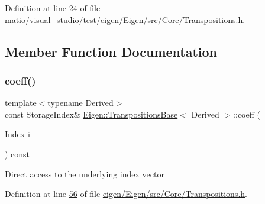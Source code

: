 Definition at line \hyperlink{matio_2visual__studio_2test_2eigen_2_eigen_2src_2_core_2_transpositions_8h_source_l00024}{24} of file \hyperlink{matio_2visual__studio_2test_2eigen_2_eigen_2src_2_core_2_transpositions_8h_source}{matio/visual\+\_\+studio/test/eigen/\+Eigen/src/\+Core/\+Transpositions.\+h}.



\subsection{Member Function Documentation}
\mbox{\label{class_eigen_1_1_transpositions_base_aae1d3847b107e518c9f2b6010a6b635a}} 
\subsubsection{\texorpdfstring{coeff()}{coeff()}\hspace{0.1cm}{\footnotesize\ttfamily [1/2]}}
{\footnotesize\ttfamily template$<$typename Derived$>$ \\
const Storage\+Index\& \hyperlink{class_eigen_1_1_transpositions_base}{Eigen\+::\+Transpositions\+Base}$<$ Derived $>$\+::coeff (\begin{DoxyParamCaption}\item[{\hyperlink{class_eigen_1_1_transpositions_base_a3f5f06118b419e8e6ccbe49ed5b4c91f}{Index}}]{i }\end{DoxyParamCaption}) const\hspace{0.3cm}{\ttfamily [inline]}}

Direct access to the underlying index vector 

Definition at line \hyperlink{eigen_2_eigen_2src_2_core_2_transpositions_8h_source_l00056}{56} of file \hyperlink{eigen_2_eigen_2src_2_core_2_transpositions_8h_source}{eigen/\+Eigen/src/\+Core/\+Transpositions.\+h}.

\mbox{\label{class_eigen_1_1_transpositions_base_aae1d3847b107e518c9f2b6010a6b635a}} 
